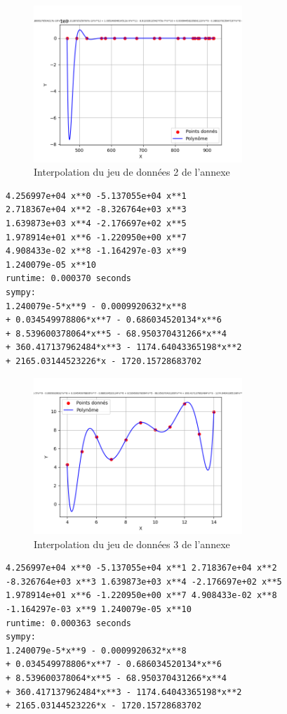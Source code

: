 \begin{figure}[h]
    \centering
    \includegraphics[width=0.7\textwidth]{sources/max/res42.-fig.png}
    \caption{Interpolation du jeu de données 2 de l'annexe}
\end{figure}
\newpage
\begin{lstlisting}[caption=res43.err, basicstyle=\fontsize{8}{10}\selectfont]
4.256997e+04 x**0 -5.137055e+04 x**1 
2.718367e+04 x**2 -8.326764e+03 x**3 
1.639873e+03 x**4 -2.176697e+02 x**5 
1.978914e+01 x**6 -1.220950e+00 x**7 
4.908433e-02 x**8 -1.164297e-03 x**9 
1.240079e-05 x**10 
runtime: 0.000370 seconds
sympy:
1.240079e-5*x**9 - 0.0009920632*x**8 
+ 0.034549978806*x**7 - 0.686034520134*x**6 
+ 8.539600378064*x**5 - 68.950370431266*x**4 
+ 360.417137962484*x**3 - 1174.64043365198*x**2 
+ 2165.03144523226*x - 1720.15728683702
\end{lstlisting}
\begin{figure}[h]
    \centering
    \includegraphics[width=0.7\textwidth]{sources/max/res43.-fig.png}
    \caption{Interpolation du jeu de données 3 de l'annexe}
\end{figure}
\newpage
\begin{lstlisting}[caption=res44.err ,basicstyle=\fontsize{8}{10}\selectfont]
4.256997e+04 x**0 -5.137055e+04 x**1 2.718367e+04 x**2 
-8.326764e+03 x**3 1.639873e+03 x**4 -2.176697e+02 x**5 
1.978914e+01 x**6 -1.220950e+00 x**7 4.908433e-02 x**8 
-1.164297e-03 x**9 1.240079e-05 x**10 
runtime: 0.000363 seconds
sympy:
1.240079e-5*x**9 - 0.0009920632*x**8 
+ 0.034549978806*x**7 - 0.686034520134*x**6 
+ 8.539600378064*x**5 - 68.950370431266*x**4 
+ 360.417137962484*x**3 - 1174.64043365198*x**2 
+ 2165.03144523226*x - 1720.15728683702
\end{lstlisting}
